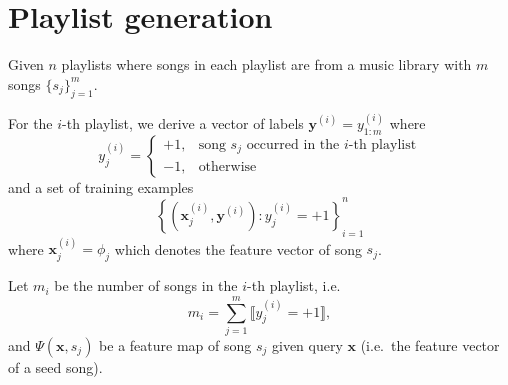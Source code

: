 \documentclass[9pt]{extarticle}
\newcommand{\llb}{\llbracket}
\newcommand{\rrb}{\rrbracket}
\newcommand{\x}{\mathbf{x}}
\newcommand{\y}{\mathbf{y}}
\newcommand{\1}{\mathbf{1}}
\newcommand{\w}{\mathbf{w}}
\newcommand{\R}{\mathbb{R}}
\newcommand{\XCal}{\mathcal{X}}
\newcommand{\YCal}{\mathcal{Y}}
\newcommand{\pb}[1]{^{({#1})}}
\newcommand{\eg}{e.g.\ }
\newcommand{\ie}{i.e.\ }
\begin{document}
\section{Playlist generation}
\label{sec:playlist}


Given $n$ playlists where songs in each playlist are from a music library with $m$ songs $\{s_j\}_{j=1}^m$.

For the $i$-th playlist, %
we derive a vector of labels $\y\pb{i} = y_{1:m}\pb{i}$ where
$$
y_j\pb{i} = 
\begin{cases}
+1, & \text{song $s_j$ occurred in the $i$-th playlist} \\
-1, & \text{otherwise}
\end{cases}
$$
and a set of training examples
$$\left\{ \left( \x_j\pb{i}, \y\pb{i} \right) \colon y_j\pb{i} = +1 \right\}_{i=1}^n$$
where $\x_j\pb{i} = \phi_j$ which denotes the feature vector of song $s_j$.


Let $m_i$ be the number of songs in the $i$-th playlist, \ie 
$$
m_i = \sum_{j=1}^m \llb y_j\pb{i} = +1 \rrb,
$$
and $\Psi(\x, s_j)$ be a feature map of song $s_j$ given query $\x$ (\ie the feature vector of a seed song).
\end{document}
